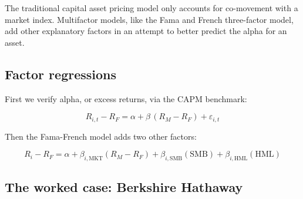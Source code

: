 
The traditional capital asset pricing model only accounts for co-movement with a
market index. Multifactor models, like the Fama and French three-factor model,
add other explanatory factors in an attempt to better predict the alpha for an
asset.

\subsection{Factor regressions}

First we verify alpha, or excess returns, via the CAPM benchmark:

\begin{imfmlbox}
\[ R_{i,t} - R_F = \alpha + \beta\,(R_M - R_F) + \varepsilon_{i,t} \]
\end{imfmlbox}

Then the Fama-French model adds two other factors:

\begin{imfmlbox}
\[ R_i - R_F = \alpha + \beta_{i,\text{MKT}}(R_M - R_F)
   + \beta_{i,\text{SMB}}(\text{SMB}) + \beta_{i,\text{HML}}(\text{HML}) \]
\end{imfmlbox}

\subsection{The worked case: Berkshire Hathaway}

